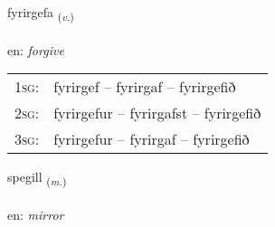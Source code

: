 \documentclass[frontgrid, backgrid]{flacards}\usepackage[]{graphicx}\usepackage[]{xcolor}
\begin{document}
\renewcommand{\flhead}{\vskip5pt \fboxsep=0pt {\small\bfseries\footnotesize Sagnorð | Verb}}
\renewcommand{\fcfoot}{\vskip5pt \fboxsep=0pt \hspace{2pt}{\small\bfseries\footnotesize 3K}}

\renewcommand{\blhead}{\vskip5pt {\small\bfseries\footnotesize Sagnorð | Verb }}
\renewcommand{\bcfoot}{\vskip5pt \hspace{2pt}{\small\bfseries\footnotesize 3K}}


{fyrirgefa \small{\textsubscript{(\textit{v.})}} \\[1ex] %
\textphonetic{[fɪːrɪrcɛva]} \\
en: \emph{forgive} \\  [2ex]
\renewcommand*{\arraystretch}{0.8}
\begin{tabular}{p{1cm}l}
\textsc{1sg}: & fyrirgef -- fyrirgaf -- fyrirgefið \\ 
\textsc{2sg}: & fyrirgefur -- fyrirgafst -- fyrirgefið \\ 
\textsc{3sg}: & fyrirgefur -- fyrirgaf -- fyrirgefið \\ 
\end{tabular}
}

\renewcommand{\flhead}{\vskip5pt \fboxsep=0pt {\small\bfseries\footnotesize Nafnorð | Noun}}
\renewcommand{\fcfoot}{\vskip5pt \fboxsep=0pt \hspace{2pt}{\small\bfseries\footnotesize 3K}}

\renewcommand{\blhead}{\vskip5pt {\small\bfseries\footnotesize Nafnorð | Noun }}
\renewcommand{\bcfoot}{\vskip5pt \hspace{2pt}{\small\bfseries\footnotesize 3K}}


{spegill \small{\textsubscript{(\textit{m.})}} \\[1ex] %
\textphonetic{[speijɪtl̥]} \\
en: \emph{mirror} \\  [2ex]
\renewcommand*{\arraystretch}{0.8}
}
\end{document}

